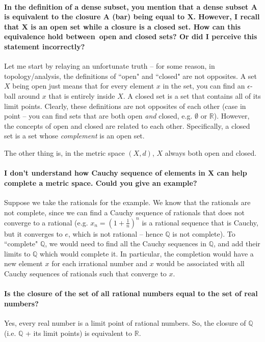 \documentclass[10pt,english]{article}
\begin{document}
\paragraph{In the definition of a dense subset, you mention that a dense subset A is equivalent to the closure A (bar) being equal to X. However, I recall that X is an open set while a closure is a closed set. How can this equivalence hold between open and closed sets? Or did I perceive this statement incorrectly?}

Let me start by relaying an unfortunate truth -- for some reason, in topology/analysis, the definitions of ``open" and ``closed" are not opposites. A set $X$ being open just means that for every element $x$ in the set, you can find an $\epsilon$-ball around $x$ that is entirely inside $X$. A closed set is a set that contains all of its limit points.
Clearly, these definitions are not opposites of each other (case in point -- you can find sets that are both open \textit{and} closed, e.g. $\emptyset$ or $\mathbb{R}$).
However, the concepts of open and closed are related to each other. Specifically, a closed set is a set whose \textit{complement} is an open set.

The other thing is, in the metric space $(X,d)$, $X$ always both open and closed.

\paragraph{I don't understand how Cauchy sequence of elements in X can help complete a metric space. Could you give an example?}

Suppose we take the rationals for the example. We know that the rationals are not complete, since we can find a Cauchy sequence of rationals that does not converge to a rational (e.g. $x_n = (1+\frac{1}{n})^n$ is a rational sequence that is Cauchy, but it converges to $e$, which is not rational -- hence $\mathbb{Q}$ is not complete).
To ``complete" $\mathbb{Q}$, we would need to find all the Cauchy sequences in $\mathbb{Q}$, and add their limits to $\mathbb{Q}$ which would complete it.
In particular, the completion would have a new element $x$ for each irrational number and $x$ would be associated with all Cauchy sequences of rationals such that converge to $x$.

\paragraph{Is the closure of the set of all rational numbers equal to the set of real numbers?}
Yes, every real number is a limit point of rational numbers.
So, the closure of $\mathbb{Q}$ (i.e. $\mathbb{Q}$ + its limit points) is equivalent to $\mathbb{R}$.
\end{document}
